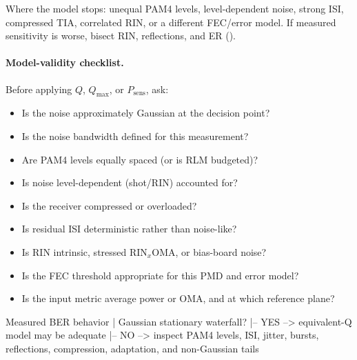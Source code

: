 Where the model stops: unequal PAM4 levels, level-dependent noise, strong ISI,
compressed TIA, correlated RIN, or a different FEC/error model. If measured
sensitivity is worse, bisect RIN, reflections, and ER
().

\paragraph{Model-validity checklist.}
Before applying $Q$, $Q_{\max}$, or $P_{\mathrm{sens}}$, ask:
\begin{itemize}
\item Is the noise approximately Gaussian at the decision point?
\item Is the noise bandwidth defined for this measurement?
\item Are PAM4 levels equally spaced (or is RLM budgeted)?
\item Is noise level-dependent (shot/RIN) accounted for?
\item Is the receiver compressed or overloaded?
\item Is residual ISI deterministic rather than noise-like?
\item Is RIN intrinsic, stressed $\mathrm{RIN}_x\mathrm{OMA}$, or bias-board noise?
\item Is the FEC threshold appropriate for this PMD and error model?
\item Is the input metric average power or OMA, and at which reference plane?
\end{itemize}

\begin{dectree}
Measured BER behavior
  |
Gaussian stationary waterfall?
  |-- YES --> equivalent-Q model may be adequate
  |-- NO  --> inspect PAM4 levels, ISI, jitter,
              bursts, reflections, compression,
              adaptation, and non-Gaussian tails
\end{dectree}


